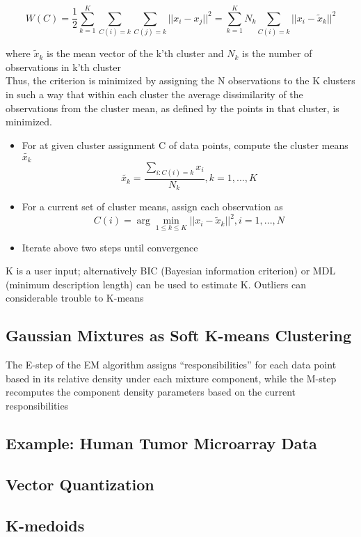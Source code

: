 \[
    W(C) = \frac{1}{2} \sum_{k=1}^{K} \sum_{C(i)=k} \sum_{{C(j)=k}} ||x_i-x_j||^2 = \sum_{k=1}^{K} N_k \sum_{C(i) = k} ||x_i-\tilde{x}_k||^2
\]

where $\tilde{x}_k$ is the mean vector of the k'th cluster and $N_k$ is the number of observations in k'th cluster\\

Thus, the criterion is minimized by
assigning the N observations to the K clusters in such a way that within
each cluster the average dissimilarity of the observations from the cluster
mean, as defined by the points in that cluster, is minimized.

\begin{itemize}
  \item For at given cluster assignment C of data points, compute the cluster means $\tilde{x_k}$
      \[
        \tilde{x_k} = \frac{\sum_{i:C(i) = k} x_i}{N_k}, k=1,...,K
      \]
  \item For a current set of cluster means, assign each observation as
      \[
        C(i) = \arg \min\limits_{1 \leq k \leq K} ||x_i - \tilde{x}_k||^2, i=1,...,N
      \]
  \item Iterate above two steps until convergence
\end{itemize}

K is a user input; alternatively BIC (Bayesian information
criterion) or MDL (minimum description length) can be used
to estimate K. Outliers can considerable trouble to K-means

\subsection{Gaussian Mixtures as Soft K-means Clustering}

The E-step of the EM algorithm assigns “responsibilities” for each data
point based in its relative density under each mixture component, while
the M-step recomputes the component density parameters based on the
current responsibilities

\subsection{Example: Human Tumor Microarray Data}

\subsection{Vector Quantization}

\subsection{K-medoids}

